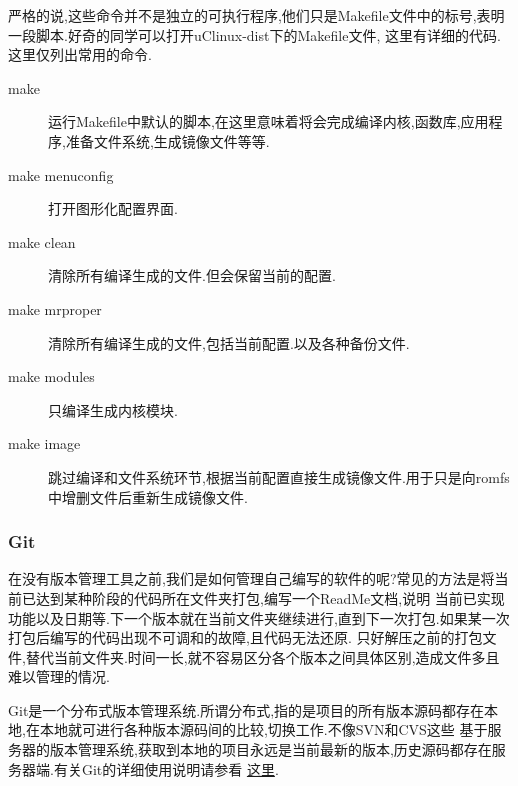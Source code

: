 \documentclass[12pt,a4paper,titlepage]{article}
\begin{document}
严格的说,这些命令并不是独立的可执行程序,他们只是Makefile文件中的标号,表明一段脚本.好奇的同学可以打开uClinux-dist下的Makefile文件,
这里有详细的代码.这里仅列出常用的命令.
\begin{description}
\item[make] 运行Makefile中默认的脚本,在这里意味着将会完成编译内核,函数库,应用程序,准备文件系统,生成镜像文件等等.
\item[make menuconfig] 打开图形化配置界面.
\item[make clean] 清除所有编译生成的文件.但会保留当前的配置.
\item[make mrproper] 清除所有编译生成的文件,包括当前配置.以及各种备份文件.
\item[make modules] 只编译生成内核模块.
\item[make image] 跳过编译和文件系统环节,根据当前配置直接生成镜像文件.用于只是向romfs中增删文件后重新生成镜像文件.
\end{description}
\subsubsection{Git}\label{git}
在没有版本管理工具之前,我们是如何管理自己编写的软件的呢?常见的方法是将当前已达到某种阶段的代码所在文件夹打包,编写一个ReadMe文档,说明
当前已实现功能以及日期等.下一个版本就在当前文件夹继续进行,直到下一次打包.如果某一次打包后编写的代码出现不可调和的故障,且代码无法还原.
只好解压之前的打包文件,替代当前文件夹.时间一长,就不容易区分各个版本之间具体区别,造成文件多且难以管理的情况.

Git是一个分布式版本管理系统.所谓分布式,指的是项目的所有版本源码都存在本地,在本地就可进行各种版本源码间的比较,切换工作.不像SVN和CVS这些
基于服务器的版本管理系统,获取到本地的项目永远是当前最新的版本,历史源码都存在服务器端.有关Git的详细使用说明请参看
\href{http://progit.org/book/}{这里}.
\end{document}
